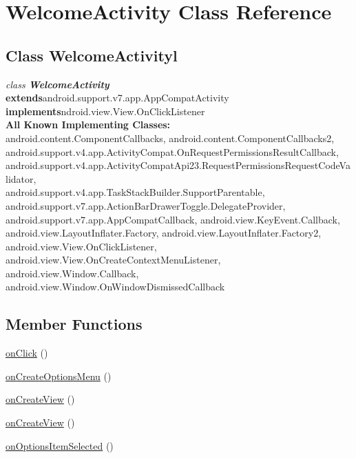 \hypertarget{class_WelcomeActivity.Android}{\section{WelcomeActivity Class Reference}
\label{class_WelcomeActivity.Android}
}

\subsection*{Class WelcomeActivityl}

\textit{class \textbf{WelcomeActivity}}\\
\tab \textbf{extends}android.support.v7.app.AppCompatActivity\\
\tab \textbf{implements}ndroid.view.View.OnClickListener\\

\textbf{All Known Implementing Classes:}\\
\tab                android.content.ComponentCallbacks, android.content.ComponentCallbacks2, \\
android.support.v4.app.ActivityCompat.OnRequestPermissionsResultCallback, \\
android.support.v4.app.ActivityCompatApi23.RequestPermissionsRequestCodeValidator,\\
 android.support.v4.app.TaskStackBuilder.SupportParentable,\\
  android.support.v7.app.ActionBarDrawerToggle.DelegateProvider, \\
  android.support.v7.app.AppCompatCallback, android.view.KeyEvent.Callback,\\
   android.view.LayoutInflater.Factory, android.view.LayoutInflater.Factory2,\\
    android.view.View.OnClickListener, android.view.View.OnCreateContextMenuListener,\\
     android.view.Window.Callback, android.view.Window.OnWindowDismissedCallback\\



\subsection*{Member Functions}
\begin{DoxyCompactItemize}
\item 
\hyperlink{class_WelcomeActivity.Android.onClick}{onClick} ()
\item 
\hyperlink{class_WelcomeActivity.Android.onCreateOptionsMenu}{onCreateOptionsMenu} ()
\item 
\hyperlink{class_WelcomeActivity.Android.onCreateView}{onCreateView} ()
\item 
\hyperlink{class_WelcomeActivity.Android.onCreateView2}{onCreateView} ()
\item 
\hyperlink{class_WelcomeActivity.Android.onOptionsItemSelected}{onOptionsItemSelected} ()
\end{DoxyCompactItemize}




